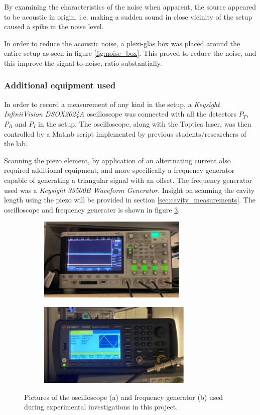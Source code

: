 By examining the characteristics of the noise when apparent, the source appeared to be acoustic in origin, i.e. making a sudden sound in close vicinity of the setup caused a spike in the noise level.

In order to reduce the acoustic noise, a plexi-glas box was placed around the entire setup as seen in figure \ref{fig:noise_box}. This proved to reduce the noise, and this improve the signal-to-noise, ratio substantially.

\subsubsection{Additional equipment used}

In order to record a measurement of any kind in the setup, a \emph{Keysight InfiniiVision DSOX2024A} oscilloscope was connected with all the detectors $P_T$, $P_R$ and $P_I$ in the setup. The oscilloscope, along with the Toptica laser, was then controlled by a Matlab script implemented by previous students/researchers of the lab. 

Scanning the piezo element, by application of an altertnating current also required additional equipment, and more specifically a frequency generator capable of generating a triangular signal with an offset. The frequency generator used was a \emph{Keysight 33500B Waveform Generator}. Insight on scanning the cavity length using the piezo will be provided in section \ref{sec:cavity_measurements}. The oscilloscope and frequency generater is shown in figure \ref{fig:scope_and_freq_generator}.

\begin{figure}[h!]
    \centering
    \begin{subfigure}[b]{0.49\textwidth}
        \centering
        \includegraphics[height=4cm]{figures/scope.pdf}
        \caption{}
        \label{fig:scope}
    \end{subfigure}
    \begin{subfigure}[b]{0.49\textwidth}
        \centering
        \includegraphics[height=4cm]{figures/frequency_generator.pdf}
        \caption{}
        \label{fig:freq_generator}
    \end{subfigure}
    \caption{Pictures of the oscilloscope (a) and frequency generator (b) used during experimental investigations in this project.}
    \label{fig:scope_and_freq_generator}
\end{figure}
